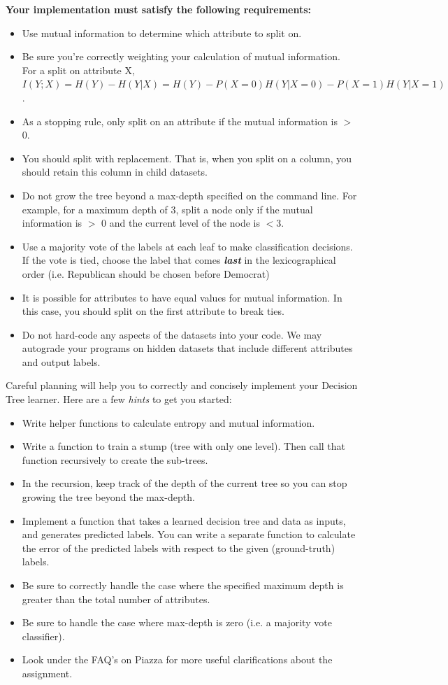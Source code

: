 \documentclass[11pt,addpoints,answers]{exam}
\begin{document}
\textbf{Your implementation must satisfy the following requirements:}
\begin{itemize}
\item Use mutual information to determine which attribute to split on.
\item Be sure you’re correctly weighting your calculation of mutual information. For a split on attribute X, $I(Y;X) = H(Y)-H(Y|X) = H(Y) - P(X=0)H(Y|X = 0) - P(X = 1)H(Y|X = 1)$.
\item As a stopping rule, only split on an attribute if the mutual information is $>$ 0. 
\item You should split with replacement. That is, when you split on a column, you should retain this column in child datasets. 
\item Do not grow the tree beyond a max-depth specified on the command line. For example, for a maximum depth of 3, split a node only if the mutual information is $>$ 0 and the current level of the node is $< 3$.
\item Use a majority vote of the labels at each leaf to make classification decisions. If the vote is tied, choose the label that comes \textbf{\textit{last}} in the lexicographical order (i.e. Republican should be chosen before Democrat)
\item It is possible for attributes to have equal values for mutual information. In this case, you should split on the first attribute to break ties.
\item Do not hard-code any aspects of the datasets into your code. We may autograde your programs on hidden datasets that include different attributes and output labels.
\end{itemize}

Careful planning will help you to correctly and concisely implement your Decision Tree learner. Here are a few \emph{hints} to get you started:
\begin{itemize}
    \item Write helper functions to calculate entropy and mutual information.
    \item Write a function to train a stump (tree with only one level). Then call that function recursively to create the sub-trees.
    \item In the recursion, keep track of the depth of the current tree so you can stop growing the tree beyond the max-depth.
    \item Implement a function that takes a learned decision tree and data as inputs, and generates predicted labels. You can write a separate function to calculate the error of the predicted labels with respect to the given (ground-truth) labels.
    \item Be sure to correctly handle the case where the specified maximum depth is greater than the total number of attributes.
    \item Be sure to handle the case where max-depth is zero (i.e. a majority vote classifier). 
    \item Look under the FAQ's on Piazza for more useful clarifications about the assignment.
\end{itemize}
\end{document}
